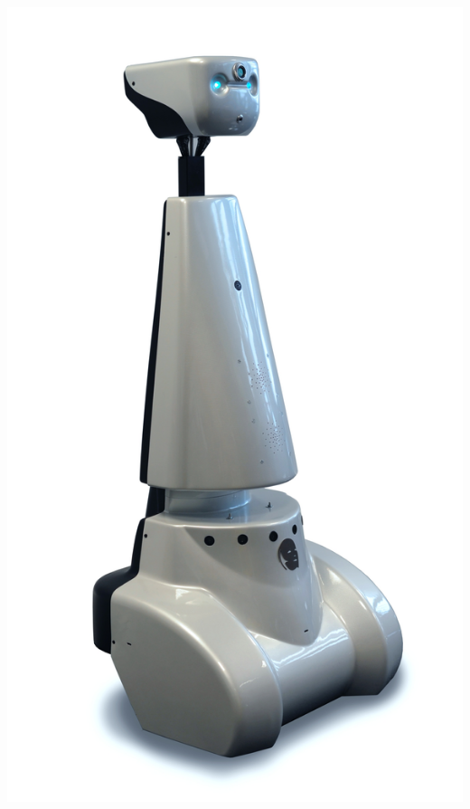 
\begin{minipage}[c]{0.5\textwidth}
  \begin{center}
    \includegraphics[width=.98\textwidth]{img/jazz/white-jazz}
  \end{center}
\end{minipage}
